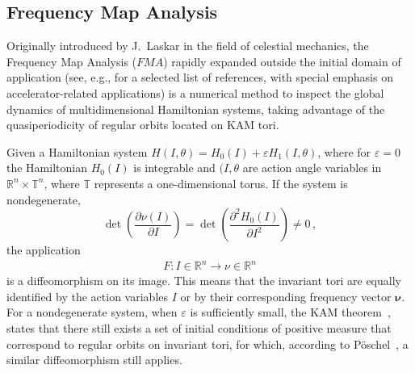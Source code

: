 \subsection{Frequency Map Analysis\label{subsec:fma}}
%
Originally introduced by J.~Laskar in the field of celestial mechanics, the Frequency Map Analysis ($FMA$) rapidly expanded outside the initial domain of application (see, e.g., \cite{laskar1995frequency,lega1996numerical,papaphilippou1996frequency,papaphilippou1998global,Laskar1999, Papaphilippou1999, laskar2000application,PhysRevSTAB.4.124201,1288929,Papaphilippou:PAC03-RPPG007,Laskar2003,PhysRevSTAB.6.114801,shun2009nonlinear,PhysRevSTAB.14.014001,papaphilippou2014,tydecks:ipac18-mopmf057,PhysRevAccelBeams.22.071002} for a selected list of references, with special emphasis on accelerator-related applications) is a numerical method to inspect the global dynamics of multidimensional Hamiltonian systems, taking advantage of the quasiperiodicity of regular orbits located on KAM tori.

Given a Hamiltonian system $H(I,\theta) = H_0 (I) + \varepsilon H_1 (I, \theta)$, where for $\varepsilon=0$ the Hamiltonian $H_0(I)$ is integrable and $(I, \theta$ are action angle variables in $\mathbb{R}^n \times \mathbb{T}^n$, where $\mathbb{T}$ represents a one-dimensional torus. %
If the system is nondegenerate,
\begin{equation}
    \operatorname{det}\left(\frac{\partial \nu(I)}{\partial I}\right)=\operatorname{det}\left(\frac{\partial^2 H_0(I)}{\partial I^2}\right) \neq 0 \,,
\end{equation}
the application
\begin{equation}
    \begin{array}{r}
    F: I\in \mathbb{R}^{n} \longrightarrow \nu\in \mathbb{R}^n 
    \end{array}
\end{equation}
is a diffeomorphism on its image. This means that the invariant tori are equally identified by the action variables $I$ or by their corresponding frequency vector $\mathbf{\nu}$. For a nondegenerate system, when $\varepsilon$ is sufficiently small, the KAM theorem~\cite{KAM1,KAM2,KAM3}, states that there still exists a set of initial conditions of positive measure that correspond to regular orbits on invariant tori, for which, according to Pöschel~\cite{Poschel1982}, a similar diffeomorphism still applies.

